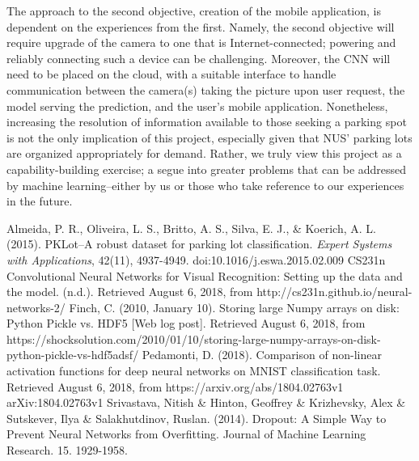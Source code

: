 \documentclass[a4paper, 11pt]{article} %
\begin{document}
	The approach to the second objective, creation of the mobile application, is
	dependent on the experiences from the first. Namely, the second objective will
	require upgrade of the camera to one that is Internet-connected; powering and
	reliably connecting such a device can be challenging.  Moreover, the CNN will
	need to be placed on the cloud, with a suitable interface to handle
	communication between the camera(s) taking the picture upon user request, the
	 model serving the prediction, and the user's mobile application.
	  Nonetheless, increasing the
	resolution of information available to those seeking a parking spot is not the
	only implication of this project, especially given that NUS' parking lots are
	organized appropriately for demand. Rather, we truly view this project as a
	capability-building exercise; a segue into greater problems that can be
	addressed by machine learning--either by us or those who take reference to our
	experiences in the future.

\newpage
\begin{thebibliography}{unsrt}
		Almeida, P. R., Oliveira, L. S., Britto, A. S., Silva, E. J., \& Koerich, A. L. (2015). PKLot--A robust 
		dataset for parking lot classification. \textit{Expert Systems with Applications}, 42(11), 
		4937-4949. doi:10.1016/j.eswa.2015.02.009
		CS231n Convolutional Neural Networks for Visual Recognition: Setting up 
		the data and the model. (n.d.). Retrieved August 6, 2018, from 
		http://cs231n.github.io/neural-networks-2/	
		Finch, C. (2010, January 10). Storing large Numpy arrays on disk: 
		Python Pickle vs. HDF5 [Web log post]. Retrieved August 6, 2018, from 
		https://shocksolution.com/2010/01/10/storing-large-numpy-arrays-on-disk-python-pickle-vs-hdf5adsf/
		Pedamonti, D. (2018). Comparison of non-linear activation functions for 
		deep neural networks on MNIST classification task. Retrieved August 6, 
		2018, from https://arxiv.org/abs/1804.02763v1 arXiv:1804.02763v1
		Srivastava, Nitish \& Hinton, Geoffrey \& Krizhevsky, Alex \& 
		Sutskever, Ilya \& Salakhutdinov, Ruslan. (2014). Dropout: A Simple Way 
		to Prevent Neural Networks from Overfitting. Journal of Machine 
		Learning Research. 15. 1929-1958.
\end{thebibliography}
\end{document}
